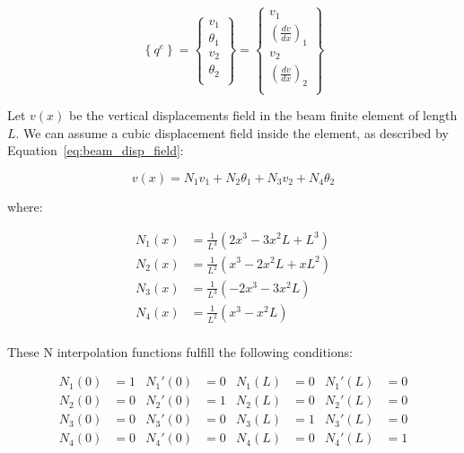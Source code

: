 \[
  \left\{ q^e \right\} =
  \begin{Bmatrix}
    v_1 \\
    \theta_1 \\
    v_2 \\
    \theta_2 \\
  \end{Bmatrix} =
  \begin{Bmatrix}
    v_1 \\
    \left( \frac{dv}{dx} \right)_1 \\
    v_2 \\
    \left( \frac{dv}{dx} \right)_2 \\
  \end{Bmatrix}
\]

Let $v(x)$ be the vertical displacements field in the beam finite element of length $L$.
We can assume a cubic displacement field inside the element, as described by Equation~\ref{eq:beam_disp_field}:

\begin{equation}
  \label{eq:beam_disp_field}
  v(x) = N_1 v_1 + N_2 \theta_1 + N_3 v_2 + N_4 \theta_2
\end{equation}

where:

\begin{equation}
  \begin{split}
    N_1(x) & = \frac{1}{L^3} \left( 2x^3 -3x^2L + L^3 \right) \\
    N_2(x) & = \frac{1}{L^2} \left( x^3 - 2x^2L + xL^2 \right) \\
    N_3(x) & = \frac{1}{L^3} \left( -2x^3 - 3x^2L \right) \\
    N_4(x) & = \frac{1}{L^2} \left( x^3 - x^2L \right) \\
  \end{split}
\end{equation}

These N interpolation functions fulfill the following conditions:

\[
  \begin{aligned}
    N_1(0) & = 1    &    N_1'(0) & = 0    &    N_1(L) & = 0    &    N_1'(L) & = 0 \\
    N_2(0) & = 0    &    N_2'(0) & = 1    &    N_2(L) & = 0    &    N_2'(L) & = 0 \\
    N_3(0) & = 0    &    N_3'(0) & = 0    &    N_3(L) & = 1    &    N_3'(L) & = 0 \\
    N_4(0) & = 0    &    N_4'(0) & = 0    &    N_4(L) & = 0    &    N_4'(L) & = 1 \\
  \end{aligned}
\]

